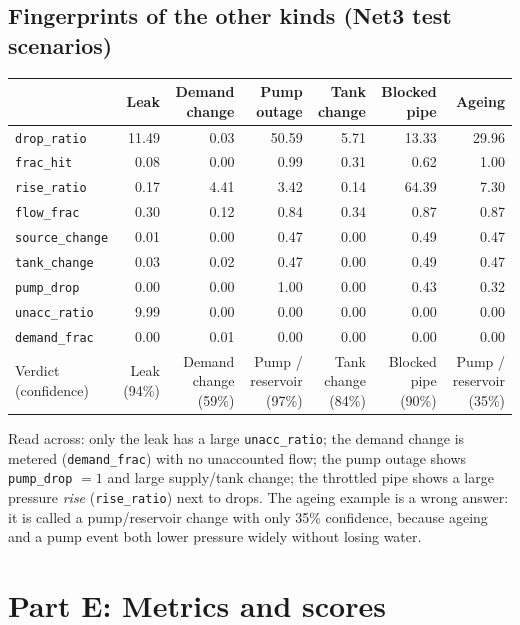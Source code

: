 \documentclass[11pt,a4paper]{article}
\newcommand{\code}[1]{\texttt{#1}}
\begin{document}
\subsection{Fingerprints of the other kinds (Net3 test scenarios)}\label{sec:examples}
\begin{center}\footnotesize\begin{tabular}{@{}lrrrrrr@{}}\toprule
 & Leak & Demand change & Pump outage & Tank change & Blocked pipe & Ageing \\\midrule
\texttt{drop\_ratio} & 11.49 & 0.03 & 50.59 & 5.71 & 13.33 & 29.96 \\
\texttt{frac\_hit} & 0.08 & 0.00 & 0.99 & 0.31 & 0.62 & 1.00 \\
\texttt{rise\_ratio} & 0.17 & 4.41 & 3.42 & 0.14 & 64.39 & 7.30 \\
\texttt{flow\_frac} & 0.30 & 0.12 & 0.84 & 0.34 & 0.87 & 0.87 \\
\texttt{source\_change} & 0.01 & 0.00 & 0.47 & 0.00 & 0.49 & 0.47 \\
\texttt{tank\_change} & 0.03 & 0.02 & 0.47 & 0.00 & 0.49 & 0.47 \\
\texttt{pump\_drop} & 0.00 & 0.00 & 1.00 & 0.00 & 0.43 & 0.32 \\
\texttt{unacc\_ratio} & 9.99 & 0.00 & 0.00 & 0.00 & 0.00 & 0.00 \\
\texttt{demand\_frac} & 0.00 & 0.01 & 0.00 & 0.00 & 0.00 & 0.00 \\
\midrule
Verdict (confidence) & Leak (94\%) & Demand change (59\%) & Pump / reservoir (97\%) & Tank change (84\%) & Blocked pipe (90\%) & Pump / reservoir (35\%) \\\bottomrule\end{tabular}\end{center}
Read across: only the leak has a large \code{unacc\_ratio}; the demand change is metered (\code{demand\_frac}) with no unaccounted flow; the pump outage shows \code{pump\_drop} $=1$ and large supply/tank change; the throttled pipe shows a large pressure \emph{rise} (\code{rise\_ratio}) next to drops. The ageing example is a wrong answer: it is called a pump/reservoir change with only 35\% confidence, because ageing and a pump event both lower pressure widely without losing water.

\section*{Part E: Metrics and scores}
\end{document}
